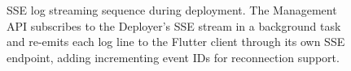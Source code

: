 \begin{figure}[htbp]
{
}%
\caption[SSE log streaming sequence]{SSE log streaming sequence during deployment. The Management API subscribes to the Deployer's SSE stream in a background task and re-emits each log line to the Flutter client through its own SSE endpoint, adding incrementing event IDs for reconnection support.}
\label{fig:sse-sequence}
\end{figure}
